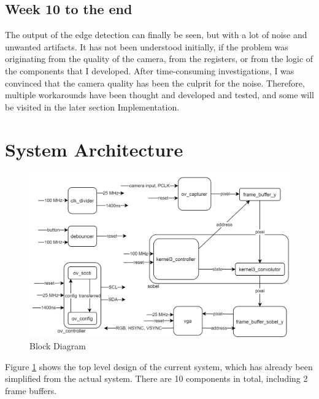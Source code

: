 \documentclass{article}
\begin{document}
	\subsection{Week 10 to the end}
		The output of the edge detection can finally be seen, but with a lot of noise and unwanted artifacts. It has not been understood initially, if the problem was originating from the quality of the camera, from the registers, or from the logic of the components that I developed. After time-consuming investigations, I was convinced that the camera quality has been the culprit for the noise. Therefore, multiple workarounds have been thought and developed and tested, and some will be visited in the later section Implementation.
	\newpage\section{System Architecture}
	\begin{figure}[h]
		\centering
		\includegraphics[scale=0.42]{block}
		\caption{Block Diagram}
		\label{fig:block}
	\end{figure}
	Figure \ref{fig:block} shows the top level design of the current system, which has already been simplified from the actual system. There are 10 components in total, including 2 frame buffers.
	\\
\end{document}
